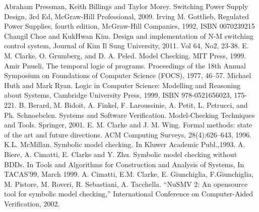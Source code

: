 \documentclass[runningheads,a4paper]{llncs}
\begin{document}
\begin{thebibliography}{4}

	Abraham Pressman, Keith Billings and Taylor Morey. Switching Power Supply Design, 3rd Ed, McGraw-Hill Professional, 2009. 
	Irving M. Gottlieb, Regulated Power Supplies, fourth edition, McGraw-Hill Companies, 1992, ISBN 0070239215	Changil Choe and KukHwan Kim. Design and implementation of N-M switching control system, Journal of Kim Il Sung University, 2011. Vol 64, No2, 23-38.
	E. M. Clarke, O. Grumberg, and D. A. Peled. Model Checking. MIT Press, 1999.
	Amir Pnueli, The temporal logic of programs. Proceedings of the 18th Annual Symposium on Foundations of Computer Science (FOCS), 1977, 46–57.
	Michael Huth and Mark Ryan. Logic in Computer Science: Modelling and Reasoning about Systems, Cambridge University Press, 1999, ISBN 978-0521656023, 175-221.
	B. Berard, M. Bidoit, A. Finkel, F. Laroussinie, A. Petit, L. Petrucci, and Ph. Schnoebelen. Systems and Software Veriﬁcation. Model-Checking Techniques and Tools. Springer, 2001.
	E. M. Clarke and J. M. Wing. Formal methods: state of the art and future directions. ACM Computing Surveys, 28(4):626–643, 1996.
	K.L. McMillan. Symbolic model checking. In Kluwer Academic Publ.,1993.
	A. Biere, A. Cimatti, E. Clarke and Y. Zhu. Symbolic model checking without BDDs. In Tools and Algorithms for Construction and Analysis of Systems, In TACAS’99, March 1999. 
	A. Cimatti, E.M. Clarke, E. Giunchiglia, F.Giunchiglia, M. Pistore, M. Roveri, R. Sebastiani, A. Tacchella. “NuSMV 2: An opensource tool for symbolic model checking,” International Conference on Computer-Aided Verification, 2002.


\end{thebibliography}
\end{document}
